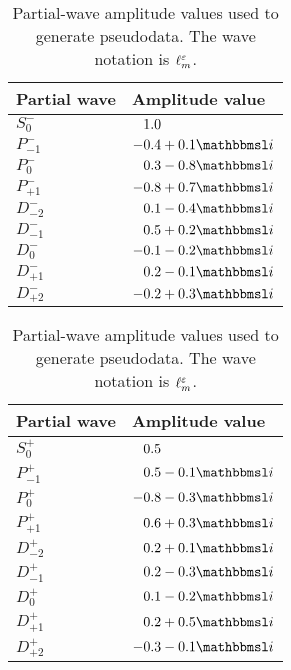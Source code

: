 \begin{table}[tbp]
  \centering%
  \renewcommand{\arraystretch}{1.2}%
  \caption{Partial-wave amplitude values used to generate pseudodata.
  The wave notation is $\ell_m^\varepsilon$.}%
  \label{tab:photoprod_study_waveset}%
  \vspace*{1ex}%
  \hfill%
  \begin{tabular}{ll}
    \toprule
    \textbf{Partial wave} &
    \textbf{Amplitude value} \\
    \midrule
    $S_0^-$    & $\hphantom{-}1.0$ \\
    $P_{-1}^-$ & $-0.4 + 0.1 \imag$ \\
    $P_0^-$    & $\hphantom{-}0.3 - 0.8 \imag$ \\
    $P_{+1}^-$ & $-0.8 + 0.7 \imag$ \\
    $D_{-2}^-$ & $\hphantom{-}0.1 - 0.4 \imag$ \\
    $D_{-1}^-$ & $\hphantom{-}0.5 + 0.2 \imag$ \\
    $D_0^-$    & $-0.1 - 0.2 \imag$ \\
    $D_{+1}^-$ & $\hphantom{-}0.2 - 0.1 \imag$ \\
    $D_{+2}^-$ & $-0.2 + 0.3 \imag$ \\
    \bottomrule
  \end{tabular}
  \hfill%
  \begin{tabular}{ll}
    \toprule
    \textbf{Partial wave} &
    \textbf{Amplitude value} \\
    \midrule
    $S_0^+$    & $\hphantom{-}0.5$ \\
    $P_{-1}^+$ & $\hphantom{-}0.5 - 0.1 \imag$ \\
    $P_0^+$    & $-0.8 - 0.3 \imag$ \\
    $P_{+1}^+$ & $\hphantom{-}0.6 + 0.3 \imag$ \\
    $D_{-2}^+$ & $\hphantom{-}0.2 + 0.1 \imag$ \\
    $D_{-1}^+$ & $\hphantom{-}0.2 - 0.3 \imag$ \\
    $D_0^+$    & $\hphantom{-}0.1 - 0.2 \imag$ \\
    $D_{+1}^+$ & $\hphantom{-}0.2 + 0.5 \imag$ \\
    $D_{+2}^+$ & $-0.3 - 0.1 \imag$ \\
    \bottomrule
  \end{tabular}
  \hfill\null%
\end{table}

